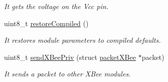 \begin{DoxyCompactItemize}
\begin{DoxyCompactList}\small\item\em It gets the voltage on the Vcc pin. \end{DoxyCompactList}\item 
uint8\+\_\+t \hyperlink{class_wasp_x_bee900_a995ae13dd52e9224d4a01fd9d0981292}{restore\+Compiled} ()
\begin{DoxyCompactList}\small\item\em It restores module parameters to compiled defaults. \end{DoxyCompactList}\item 
uint8\+\_\+t \hyperlink{class_wasp_x_bee900_a25d95f2abfdacf745a706832c09a1c47}{send\+X\+Bee\+Priv} (struct \hyperlink{structpacket_x_bee}{packet\+X\+Bee} $\ast$packet)
\begin{DoxyCompactList}\small\item\em It sends a packet to other X\+Bee modules. \end{DoxyCompactList}\end{DoxyCompactItemize}
